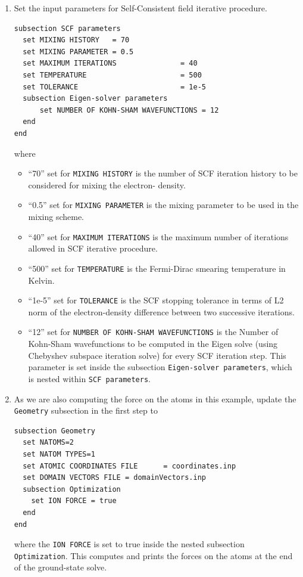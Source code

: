 \begin{enumerate}
\item Set the input parameters for Self-Consistent field iterative procedure.
\begin{verbatim}
subsection SCF parameters
  set MIXING HISTORY   = 70
  set MIXING PARAMETER = 0.5
  set MAXIMUM ITERATIONS               = 40
  set TEMPERATURE                      = 500
  set TOLERANCE                        = 1e-5
  subsection Eigen-solver parameters
      set NUMBER OF KOHN-SHAM WAVEFUNCTIONS = 12
  end
end	
\end{verbatim}
where
\begin{itemize}		
\item ``70'' set for \verb|MIXING HISTORY| is the number of SCF iteration history to be considered for mixing the electron-
density.
\item ``0.5'' set for \verb|MIXING PARAMETER| is the mixing parameter to be used in the mixing scheme.
\item ``40'' set for \verb|MAXIMUM ITERATIONS| is the maximum number of iterations allowed in SCF iterative procedure.
\item ``500'' set for \verb|TEMPERATURE| is the Fermi-Dirac smearing temperature in Kelvin.
\item ``1e-5'' set for \verb|TOLERANCE| is the SCF stopping tolerance in terms of L2 norm of the electron-density
difference between two successive iterations.
\item ``12'' set for \verb|NUMBER OF KOHN-SHAM WAVEFUNCTIONS| is the Number of Kohn-Sham wavefunctions to be computed in the Eigen solve (using Chebyshev subspace iteration solve) for every SCF iteration step. This parameter is set inside the subsection \verb|Eigen-solver parameters|, which is nested within \verb|SCF parameters|.
\end{itemize}

\item As we are also computing the force on the atoms in this example, update the \verb|Geometry| subsection in the first step to
\begin{verbatim}
subsection Geometry
  set NATOMS=2
  set NATOM TYPES=1
  set ATOMIC COORDINATES FILE      = coordinates.inp 
  set DOMAIN VECTORS FILE = domainVectors.inp
  subsection Optimization
    set ION FORCE = true
  end
end
\end{verbatim}
where the \verb|ION FORCE| is set to true inside the nested subsection \verb|Optimization|. This computes and prints the forces on the atoms at the end of the ground-state solve.


\end{enumerate}
